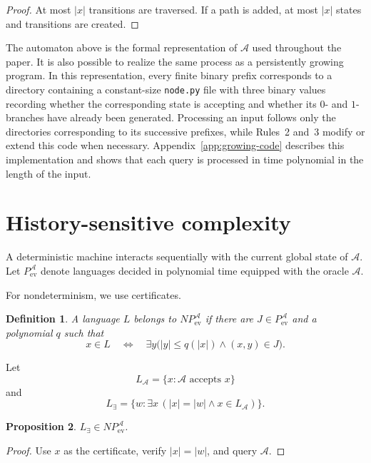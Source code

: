 \documentclass[11pt]{article}
\newtheorem{definition}{Definition}[section]
\newtheorem{proposition}[definition]{Proposition}
\newcommand{\Aev}{\mathcal A}
\begin{document}
\begin{proof}
At most \(|x|\) transitions are traversed. If a path is added, at most \(|x|\) states and
transitions are created.
\end{proof}

The automaton above is the formal representation of \(\mathcal A\) used
throughout the paper.  It is also possible to realize the same process as a
persistently growing program.  In this representation, every finite binary
prefix corresponds to a directory containing a constant-size
\texttt{node.py} file with three binary values recording whether the
corresponding state is accepting and whether its \(0\)- and \(1\)-branches
have already been generated.  Processing an input follows only the
directories corresponding to its successive prefixes, while Rules~2 and~3
modify or extend this code when necessary.  Appendix~\ref{app:growing-code}
describes this implementation and shows that each query is processed in
time polynomial in the length of the input.

\section{History-sensitive complexity}

A deterministic machine interacts sequentially with the current global state of \(\Aev\).
Let \(P_{\mathrm{ev}}^{\Aev}\) denote languages decided in polynomial time equipped with the oracle \(\Aev\).

For nondeterminism, we use certificates.

\begin{definition}
A language \(L\) belongs to \(NP_{\mathrm{ev}}^{\Aev}\) if there are
\(J\in P_{\mathrm{ev}}^{\Aev}\) and a polynomial \(q\) such that
\[
x\in L
\quad\Longleftrightarrow\quad
\exists y\bigl(|y|\le q(|x|)\land (x,y)\in J\bigr).
\]
\end{definition}

Let
\[
L_{\Aev}=\{x:\Aev\text{ accepts }x\}
\]
 and
\[
L_{\exists}
=
\{w:\exists x\,(|x|=|w|\land x\in L_{\Aev})\}.
\]

\begin{proposition}\label{prop:belongtoNP}
\(L_{\exists}\in NP_{\mathrm{ev}}^{\Aev}\).
\end{proposition}

\begin{proof}
Use \(x\) as the certificate, verify \(|x|=|w|\), and query \(\Aev\).
\end{proof}
\end{document}
